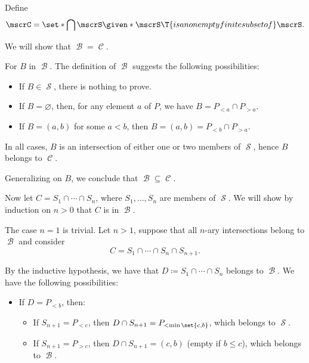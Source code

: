 \begin{defproof}
   Define
  \begin{equation*}
    \mscrC = \set*{ \bigcap \mscrS \given* \mscrS \T{is a nonempty finite subset of} \mscrS }.
  \end{equation*}

  We will show that \( \mscrB = \mscrC \).

   For \( B \) in \( \mscrB \). The definition of \( \mscrB \) suggests the following possibilities:
  \begin{itemize}
    \item If \( B \in \mscrS \), there is nothing to prove.
    \item If \( B = \varnothing \), then, for any element \( a \) of \( P \), we have \( B = P_{<a} \cap P_{>a} \).
    \item If \( B = (a, b) \) for some \( a < b \), then \( B = (a, b) = P_{<b} \cap P_{>a} \).
  \end{itemize}

  In all cases, \( B \) is an intersection of either one or two members of \( \mscrS \), hence \( B \) belongs to \( \mscrC \).

  Generalizing on \( B \), we conclude that \( \mscrB \subseteq \mscrC \).

   Now let \( C = S_1 \cap \cdots \cap S_n \), where \( S_1, \ldots, S_n \) are members of \( \mscrS \). We will show by induction on \( n > 0 \) that \( C \) is in \( \mscrB \).

  The case \( n = 1 \) is trivial. Let \( n > 1 \), suppose that all \( n \)-ary intersections belong to \( \mscrB \) and consider
  \begin{equation*}
    C = S_1 \cap \cdots \cap S_n \cap S_{n+1}.
  \end{equation*}

  By the inductive hypothesis, we have that \( D \coloneqq S_1 \cap \cdots \cap S_n \) belongs to \( \mscrB \). We have the following possibilities:
  \begin{itemize}
    \item If \( D = P_{<b} \), then:
    \begin{itemize}
      \item If \( S_{n+1} = P_{<c} \), then \( D \cap S_{n+1} = P_{<\min\set{c, b}} \), which belongs to \( \mscrS \).
      \item If \( S_{n+1} = P_{>c} \), then \( D \cap S_{n+1} = (c, b) \) (empty if \( b \leq c \)), which belongs to \( \mscrB \).
    \end{itemize}


\end{itemize}
\end{defproof}
